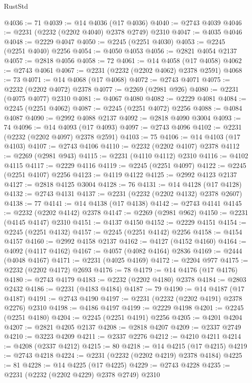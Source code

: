 \begin{lexlean}{RustStd}
\begin{coremodule}
@4036 := 71
@4039 := @14 @4036 (@17 @4036)
@4040 := @2743 @4039
@4046 := @2231 (@2232 (@2202 @4040) @2378 @2749) @2310
@4047 := @4035 @4046
@4048 := @2229 @4047
@4050 := @2245 (@2251 @4030)
@4053 := @2245 (@2251 @4040) @2256
@4054 := @4050 @4053
@4056 := @2821 @4054 @2137
@4057 := @2818 @4056
@4058 := 72
@4061 := @14 @4058 (@17 @4058)
@4062 := @2743 @4061
@4067 := @2231 (@2232 (@2202 @4062) @2378 @2591)
@4068 := 73
@4071 := @14 @4068 (@17 @4068)
@4072 := @2743 @4071
@4075 := @2232 (@2202 @4072) @2378
@4077 := @2269 (@2981 @926)
@4080 := @2231 (@4075 @4077) @2310
@4081 := @4067 @4080
@4082 := @2229 @4081
@4084 := @2245 (@2251 @4062)
@4087 := @2245 (@2251 @4072) @2256
@4088 := @4084 @4087
@4090 := @2992 @4088 @2137
@4092 := @2818 @4090 @3004
@4093 := 74
@4096 := @14 @4093 (@17 @4093)
@4097 := @2743 @4096
@4102 := @2231 (@2232 (@2202 @4097) @2378 @2591)
@4103 := 75
@4106 := @14 @4103 (@17 @4103)
@4107 := @2743 @4106
@4110 := @2232 (@2202 @4107) @2378
@4112 := @2269 (@2981 @943)
@4115 := @2231 (@4110 @4112) @2310
@4116 := @4102 @4115
@4117 := @2229 @4116
@4119 := @2245 (@2251 @4097)
@4122 := @2245 (@2251 @4107) @2256
@4123 := @4119 @4122
@4125 := @2992 @4123 @2137
@4127 := @2818 @4125 @3004
@4128 := 76
@4131 := @14 @4128 (@17 @4128)
@4132 := @2743 @4131
@4137 := @2231 (@2232 (@2202 @4132) @2378 @2607)
@4138 := 77
@4141 := @14 @4138 (@17 @4138)
@4142 := @2743 @4141
@4145 := @2232 (@2202 @4142) @2378
@4147 := @2269 (@2981 @962)
@4150 := @2231 (@4145 @4147) @2310
@4151 := @4137 @4150
@4152 := @2229 @4151
@4154 := @2245 (@2251 @4132)
@4157 := @2245 (@2251 @4142) @2256
@4158 := @4154 @4157
@4160 := @2992 @4158 @2137
@4162 := @4127 (@4152 @4160)
@4164 := @4092 (@4117 @4162)
@4167 := @4057 (@4082 @4164) @2836
@4169 := @2444 (@4048 @4167)
@4171 := @2231 (@4025 @4169)
@4172 := @2204 @977
@4175 := @2232 (@2202 @4172) @2693
@4176 := 78
@4179 := @14 @4176 (@17 @4176)
@4180 := @2743 @4179
@4183 := @2232 (@2202 @4180) @2378
@4184 := @2803 @2432
@4186 := @2231 (@4183 @4184)
@4187 := 79
@4190 := @14 @4187 (@17 @4187)
@4191 := @2743 @4190
@4197 := @2231 (@2232 (@2202 @4191) @2378 @2276) @2310
@4198 := @4186 @4197
@4199 := @2229 @4198
@4201 := @2245 (@2251 @4180)
@4204 := @2245 (@2251 @4191) @2256
@4205 := @4201 @4204
@4207 := @2821 @4205 @2137
@4208 := @2818 @4207
@4209 := @2337 @2749
@4210 := @3223 @4209
@4211 := @2337 @2276
@4212 := @4210 @4211
@4214 := @4208 (@2337 @4212)
@4215 := 80
@4218 := @14 @4215 (@17 @4215)
@4219 := @2743 @4218
@4224 := @2231 (@2232 (@2202 @4219) @2378 @4184)
@4225 := 81
@4228 := @14 @4225 (@17 @4225)
@4229 := @2743 @4228
@4235 := @2231 (@2232 (@2202 @4229) @2378 @2749) @2310

\end{coremodule}
\end{lexlean}
